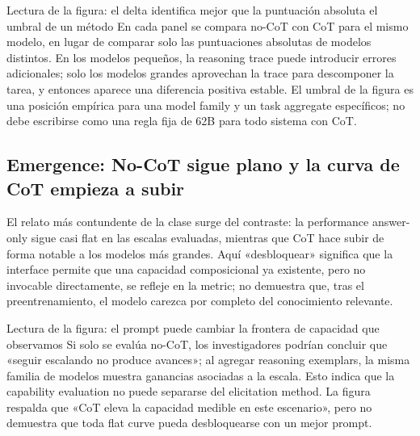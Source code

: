 
\begin{knowledgebox}{Lectura de la figura: el delta identifica mejor que la puntuación absoluta el umbral de un método}
En cada panel se compara no-CoT con CoT para el mismo modelo, en lugar de comparar solo las puntuaciones absolutas de modelos distintos. En los modelos pequeños, la reasoning trace puede introducir errores adicionales; solo los modelos grandes aprovechan la trace para descomponer la tarea, y entonces aparece una diferencia positiva estable. El umbral de la figura es una posición empírica para una model family y un task aggregate específicos; no debe escribirse como una regla fija de 62B para todo sistema con CoT.
\end{knowledgebox}

\subsection{Emergence: No-CoT sigue plano y la curva de CoT empieza a subir}

El relato más contundente de la clase surge del contraste: la performance answer-only sigue casi flat en las escalas evaluadas, mientras que CoT hace subir de forma notable a los modelos más grandes. Aquí «desbloquear» significa que la interface permite que una capacidad composicional ya existente, pero no invocable directamente, se refleje en la metric; no demuestra que, tras el preentrenamiento, el modelo carezca por completo del conocimiento relevante.


\begin{knowledgebox}{Lectura de la figura: el prompt puede cambiar la frontera de capacidad que observamos}
Si solo se evalúa no-CoT, los investigadores podrían concluir que «seguir escalando no produce avances»; al agregar reasoning exemplars, la misma familia de modelos muestra ganancias asociadas a la escala. Esto indica que la capability evaluation no puede separarse del elicitation method. La figura respalda que «CoT eleva la capacidad medible en este escenario», pero no demuestra que toda flat curve pueda desbloquearse con un mejor prompt.
\end{knowledgebox}

